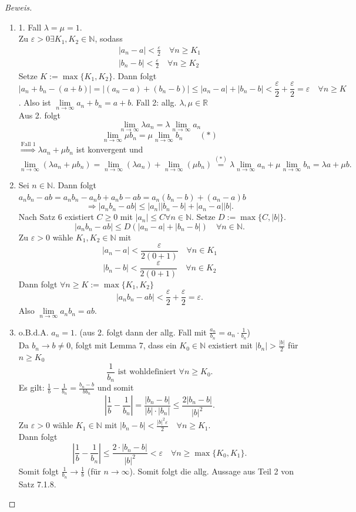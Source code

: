 \documentclass[12pt,a4paper,titlepage]{article} %
\theoremstyle{definition}
\theoremstyle{remark}
\newenvironment{bew}{\begin{proof}[Beweis]}{\end{proof}}
\newcommand{\N}{\mathbb{N}}
\newcommand{\R}{\mathbb{R}}
\begin{document}
\begin{bew}
	\begin{enumerate}
		\item 1. Fall $\lambda = \mu = 1$.\\
		Zu $\varepsilon>0 \exists K_1, K_2 \in\N$, sodass
		\begin{align*}
			|a_n-a|<\frac{\varepsilon}{2} \quad \forall n\geq K_1\\
			|b_n-b|<\frac{\varepsilon}{2} \quad \forall n\geq K_2
		\end{align*}
		Setze $K := \max \{K_1, K_2\}$. Dann folgt 
		$$|a_n + b_n - (a+b)| = |(a_n-a)+(b_n-b)| \leq |a_n-a|+|b_n-b| < \frac{\varepsilon}{2} + \frac{\varepsilon}{2} = \varepsilon \quad \forall n\geq K$$.
		Also ist $\lim\limits_{n\rightarrow\infty}a_n+b_n=a+b$.
		Fall 2: allg. $\lambda,\mu\in\R$\\
		Aus 2. folgt 
		$$\lim\limits_{n\rightarrow\infty} \lambda a_n = \lambda \lim\limits_{n\rightarrow\infty} a_n$$
		$$\lim\limits_{n\rightarrow\infty} \mu b_n = \mu \lim\limits_{n\rightarrow\infty} b_n \qquad(*)$$
		$\overset{\text{Fall 1}}{\Rightarrow} \lambda a_n + \mu b_n$ ist konvergent und $$\lim\limits_{n\rightarrow\infty} (\lambda a_n + \mu b_n) = \lim\limits_{n\rightarrow\infty} (\lambda a_n) + \lim\limits_{n\rightarrow\infty} (\mu b_n) \overset{(*)}{=} \lambda \lim\limits_{n\rightarrow\infty} a_n + \mu \lim\limits_{n\rightarrow\infty} b_n = \lambda a + \mu b.$$
		\item Sei $n\in\N$. Dann folgt $a_nb_n-ab = a_nb_n -a_nb + a_n b - ab=a_n(b_n-b)+(a_n-a)b$
		$$\Rightarrow |a_nb_n -ab|\leq |a_n| |b_n-b| + |a_n-a||b|.$$
		Nach Satz 6 existiert $C\geq 0$ mit $|a_n|\leq C \forall n\in\N$. Setze $D:= \max \{C, |b|\}$. 
		$$|a_nb_n-ab| \leq D(|a_n-a|+|b_n-b|) \quad \forall n\in\N.$$
		Zu $\varepsilon > 0$ wähle $K_1,K_2\in\N$ mit $$|a_n-a|<\frac{\varepsilon}{2(0+1)} \quad \forall n\in K_1$$
		$$|b_n-b|<\frac{\varepsilon}{2(0+1)} \quad \forall n\in K_2$$
		Dann folgt $\forall n\geq K := \max \{K_1, K_2\}$
		$$|a_nb_n -ab|<\frac{\varepsilon}{2} + \frac{\varepsilon}{2} = \varepsilon.$$
		Also $\lim\limits_{n\rightarrow\infty} a_nb_n = ab$.
		\item o.B.d.A. \(a_n = 1\). (aus 2. folgt dann der allg. Fall mit \( \frac{a_n}{b_n} = a_n \cdot\frac{1}{b_n} \))\\
		Da \(b_n \rightarrow b \neq 0\), folgt mit Lemma 7, dass ein \(K_0\in\N\) existiert mit \(|b_n| >\frac{|b|}{2} \) für \(n\geq K_0\) 
		\[\frac{1}{b_n} \text{ ist wohldefiniert } \forall n\geq K_0.\]
		Es gilt: \( \frac{1}{b} - \frac{1}{b_n} = \frac{b_n - b}{b b_n} \) und somit 
		\[ \left| \frac{1}{b} - \frac{1}{b_n} \right| = \frac{|b_n-b|}{|b| \cdot |b_n|} \leq \frac{2 |b_n - b|}{|b|^2}. \]
		Zu \(\varepsilon >0 \) wähle \(K_1 \in \N \) mit \(|b_n - b| < \frac{|b|^2\varepsilon}{2} \quad \forall n\geq K_1 \).\\
		Dann folgt 
		\[ \left| \frac{1}{b} - \frac{1}{b_n} \right| \leq \frac{2 \cdot |b_n - b|}{|b|^2} < \varepsilon \quad \forall n\geq\max \{ K_0,K_1\}. \]
		Somit folgt \( \frac{1}{b_n} \rightarrow \frac{1}{b} \) (für \(n\rightarrow \infty \)). Somit folgt die allg. Aussage aus Teil 2 von Satz 7.1.8.
	\end{enumerate}
\end{bew}
\end{document}
